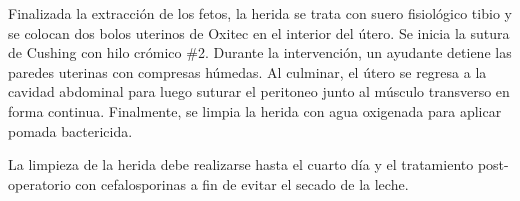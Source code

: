             Finalizada la extracción de los fetos, la herida se trata con suero fisiológico tibio y se colocan dos bolos uterinos de Oxitec en el interior del útero. Se inicia la sutura de Cushing con hilo crómico \#2. Durante la intervención, un ayudante detiene las paredes uterinas con compresas húmedas. Al culminar, el útero se regresa a la cavidad abdominal para luego suturar el peritoneo junto al músculo transverso en forma continua. Finalmente, se limpia la herida con agua oxigenada para aplicar pomada bactericida.

            La limpieza de la herida debe realizarse hasta el cuarto día y el tratamiento post-operatorio con cefalosporinas a fin de evitar el secado de la leche. %
